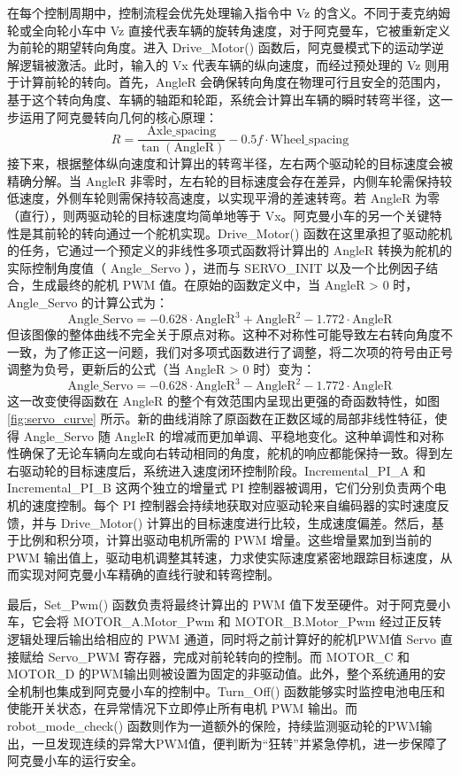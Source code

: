 \documentclass[UTF8]{ctexart}
\begin{document}
在每个控制周期中，控制流程会优先处理输入指令中 Vz 的含义。不同于麦克纳姆轮或全向轮小车中 Vz 直接代表车辆的旋转角速度，对于阿克曼车，它被重新定义为前轮的期望转向角度。进入 Drive\_Motor() 函数后，阿克曼模式下的运动学逆解逻辑被激活。此时，输入的 Vx 代表车辆的纵向速度，而经过预处理的 Vz 则用于计算前轮的转向。首先，AngleR 会确保转向角度在物理可行且安全的范围内，基于这个转向角度、车辆的轴距和轮距，系统会计算出车辆的瞬时转弯半径，这一步运用了阿克曼转向几何的核心原理：
\[
R = \frac{\text{Axle\_spacing}}{\tan(\text{AngleR})} - 0.5f \cdot \text{Wheel\_spacing}
\]
接下来，根据整体纵向速度和计算出的转弯半径，左右两个驱动轮的目标速度会被精确分解。当 AngleR 非零时，左右轮的目标速度会存在差异，内侧车轮需保持较低速度，外侧车轮则需保持较高速度，以实现平滑的差速转弯。若 AngleR 为零（直行），则两驱动轮的目标速度均简单地等于 Vx。阿克曼小车的另一个关键特性是其前轮的转向通过一个舵机实现。Drive\_Motor() 函数在这里承担了驱动舵机的任务，它通过一个预定义的非线性多项式函数将计算出的 AngleR 转换为舵机的实际控制角度值（ Angle\_Servo ），进而与 SERVO\_INIT 以及一个比例因子结合，生成最终的舵机 PWM 值。在原始的函数定义中，当 AngleR > 0 时， Angle\_Servo 的计算公式为：
\[
\text{Angle\_Servo} = -0.628 \cdot \text{AngleR}^3 + \text{AngleR}^2 - 1.772 \cdot \text{AngleR}
\]
但该图像的整体曲线不完全关于原点对称。这种不对称性可能导致左右转向角度不一致，为了修正这一问题，我们对多项式函数进行了调整，将二次项的符号由正号调整为负号，更新后的公式（当 AngleR > 0 时）变为：
\[
\text{Angle\_Servo} = -0.628 \cdot \text{AngleR}^3 - \text{AngleR}^2 - 1.772 \cdot \text{AngleR}
\]
这一改变使得函数在 AngleR 的整个有效范围内呈现出更强的奇函数特性，如图 \ref{fig:servo_curve} 所示。新的曲线消除了原函数在正数区域的局部非线性特征，使得 Angle\_Servo 随 AngleR 的增减而更加单调、平稳地变化。这种单调性和对称性确保了无论车辆向左或向右转动相同的角度，舵机的响应都能保持一致。得到左右驱动轮的目标速度后，系统进入速度闭环控制阶段。Incremental\_PI\_A 和 Incremental\_PI\_B 这两个独立的增量式 PI 控制器被调用，它们分别负责两个电机的速度控制。每个 PI 控制器会持续地获取对应驱动轮来自编码器的实时速度反馈，并与 Drive\_Motor() 计算出的目标速度进行比较，生成速度偏差。然后，基于比例和积分项，计算出驱动电机所需的 PWM 增量。这些增量累加到当前的 PWM 输出值上，驱动电机调整其转速，力求使实际速度紧密地跟踪目标速度，从而实现对阿克曼小车精确的直线行驶和转弯控制。

最后，Set\_Pwm() 函数负责将最终计算出的 PWM 值下发至硬件。对于阿克曼小车，它会将 MOTOR\_A.Motor\_Pwm 和 MOTOR\_B.Motor\_Pwm 经过正反转逻辑处理后输出给相应的 PWM 通道，同时将之前计算好的舵机PWM值 Servo 直接赋给 Servo\_PWM 寄存器，完成对前轮转向的控制。而 MOTOR\_C 和 MOTOR\_D 的PWM输出则被设置为固定的非驱动值。此外，整个系统通用的安全机制也集成到阿克曼小车的控制中。Turn\_Off() 函数能够实时监控电池电压和使能开关状态，在异常情况下立即停止所有电机 PWM 输出。而 robot\_mode\_check() 函数则作为一道额外的保险，持续监测驱动轮的PWM输出，一旦发现连续的异常大PWM值，便判断为“狂转”并紧急停机，进一步保障了阿克曼小车的运行安全。
\end{document}
